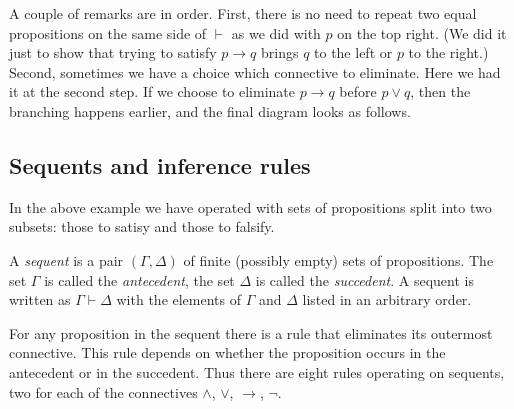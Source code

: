\begin{page}
A couple of remarks are in order.
First, there is no need to repeat two equal propositions on the same side of $\vdash$ as we did with $p$ on the top right.
(We did it just to show that trying to satisfy $p \to q$ brings $q$ to the left or $p$ to the right.)
Second, sometimes we have a choice which connective to eliminate.
Here we had it at the second step.
If we choose to eliminate $p \to q$ before $p \vee q$, then the branching happens earlier, and the final diagram looks as follows.
\begin{prooftree}
\end{prooftree}



\subsection{Sequents and inference rules}
In the above example we have operated with sets of propositions split into two subsets: those to satisy and those to falsify.

\end{page}

\begin{page}

\begin{dfn}
A \emph{sequent} is a pair $(\Gamma, \Delta)$ of finite (possibly empty) sets of propositions.
The set $\Gamma$ is called the \emph{antecedent}, the set $\Delta$ is called the \emph{succedent}.
A sequent is written as $\Gamma \vdash \Delta$ with the elements of $\Gamma$ and $\Delta$ listed in an arbitrary order.
\end{dfn}

\end{page}

\begin{page}


For any proposition in the sequent there is a rule that eliminates its outermost connective.
This rule depends on whether the proposition occurs in the antecedent or in the succedent.
Thus there are eight rules operating on sequents, two for each of the connectives $\wedge$, $\vee$, $\to$, $\neg$.


\end{page}

